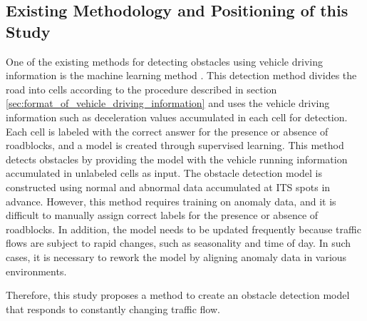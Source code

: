 \documentclass[paper]{ieice}
\begin{document}
\subsection{Existing Methodology and Positioning of this Study}
\label{sec:existing_methodology_and_positioning_of_this_study}
%
One of the existing methods for detecting obstacles using vehicle driving information is the machine learning method \cite{tadokoro}.
%
This detection method divides the road into cells according to the procedure described in section \ref{sec:format_of_vehicle_driving_information} and uses the vehicle driving information such as deceleration values accumulated in each cell for detection.
%
Each cell is labeled with the correct answer for the presence or absence of roadblocks, and a model is created through supervised learning.
%
This method detects obstacles by providing the model with the vehicle running information accumulated in unlabeled cells as input.
%
The obstacle detection model is constructed using normal and abnormal data accumulated at ITS spots in advance.
%
However, this method requires training on anomaly data, and it is difficult to manually assign correct labels for the presence or absence of roadblocks.
%
In addition, the model needs to be updated frequently because traffic flows are subject to rapid changes, such as seasonality and time of day.
%
In such cases, it is necessary to rework the model by aligning anomaly data in various environments.
%
\par
%
Therefore, this study proposes a method to create an obstacle detection model that responds to constantly changing traffic flow.
\end{document}
